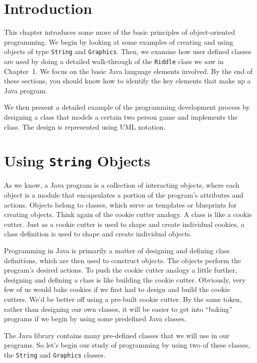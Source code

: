 \section{Introduction}
\noindent This chapter introduces some more of the basic principles of
object-oriented programming.  We begin
by looking at some examples of creating and using objects of 
type {\tt String} and {\tt Graphics}.
Then, we examine how user defined classes are used by doing a detailed
walk-through of the {\tt Riddle} class we saw in Chapter~1.
We focus on the basic Java language elements involved.  By the end of 
these sections,
you should know how to identify the key elements that make up a Java program.

We then present a detailed example of the programming development
process by designing a class that models a certain two person game
and implements the class.
The design is represented using UML notation.

\section{Using {\tt String} Objects}

\noindent As we know, a Java program is a collection of interacting
objects, where each object is a module that encapsulates a portion of
the program's attributes and actions. Objects belong to classes, which
serve as templates or blueprints for creating objects. Think again of
the cookie cutter analogy. A class is like a cookie cutter. Just as a
cookie cutter is used to shape and create individual cookies, a class
definition is used to shape and create individual objects.

Programming in Java is primarily a matter of designing and defining
class definitions, which are then used to construct objects. The
objects perform the program's desired actions. To push the cookie
cutter analogy a little further, designing and defining a class is
like building the cookie cutter.  Obviously, very few of us would bake
cookies if we first had to design and build the cookie cutters. We'd
be better off using a pre-built cookie cutter. By the same token,
rather than designing our own classes, it will be easier to get into
``baking'' programs if we begin by using some predefined Java classes.

The Java library contains many pre-defined classes that we will use in
our programs. So let's begin our study of programming by using two of
these classes, the {\tt String} and {\tt Graphics} classes.

